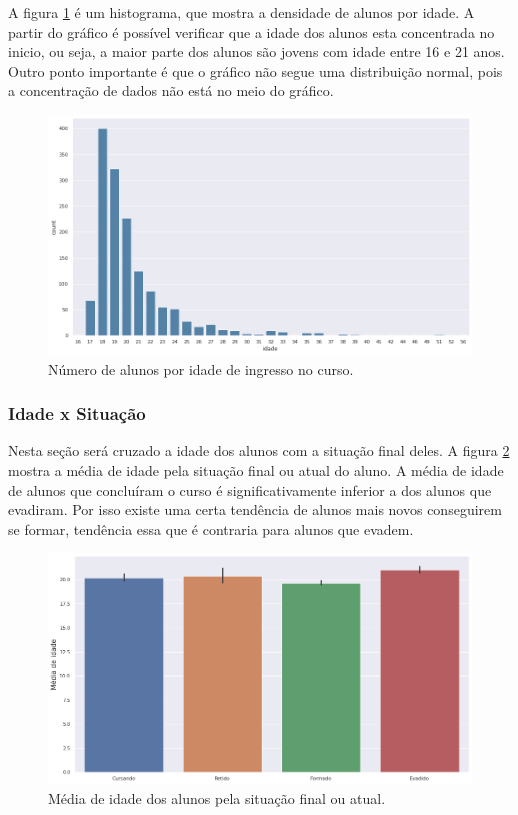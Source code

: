 \documentclass[diss,capa]{texufpel}
\begin{document}
A figura \ref{fig:histograma-idade} é um histograma, que mostra a densidade de alunos por idade.
A partir do gráfico é possível verificar que a idade dos alunos esta concentrada no inicio, ou seja, a maior parte dos alunos são jovens com idade entre 16 e 21 anos. Outro ponto importante é que o gráfico não segue uma distribuição normal, pois a concentração de dados não está no meio do gráfico.


\begin{figure}[htbp]
\centering \includegraphics[scale=.45]{imagens/histograma-idade.png}
\caption{Número de alunos por idade de ingresso no curso.}
\label{fig:histograma-idade}
\end{figure}

\subsubsection{Idade x Situação}

Nesta seção será cruzado a idade dos alunos com a situação final deles.
A figura \ref{fig:media-idade-situacao} mostra a média de idade pela situação final ou atual do aluno.
A média de idade de alunos que concluíram o curso é significativamente inferior a dos alunos que evadiram.
Por isso existe uma certa tendência de alunos mais novos conseguirem se formar, tendência essa que é contraria para alunos que evadem.

\begin{figure}[htbp]
\centering \includegraphics[scale=.45]{imagens/media-idade-situacao.png}
\caption{Média de idade dos alunos pela situação final ou atual.}
\label{fig:media-idade-situacao}
\end{figure}
\end{document}
